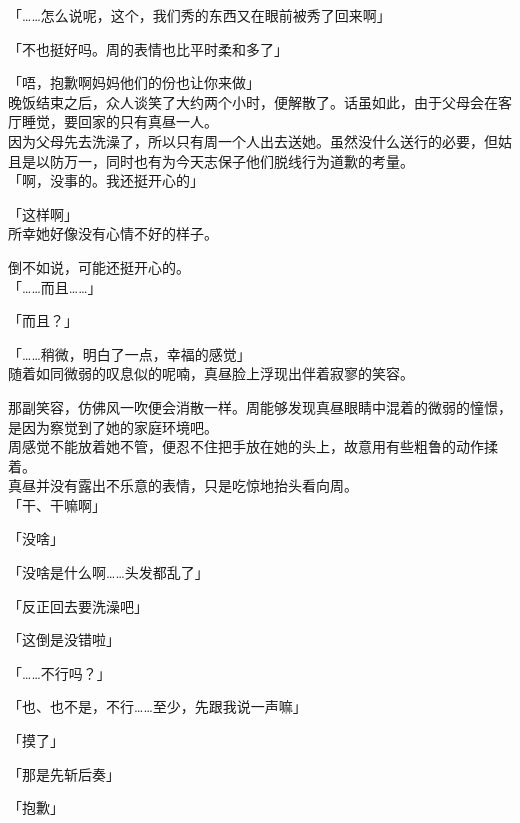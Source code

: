 「……怎么说呢，这个，我们秀的东西又在眼前被秀了回来啊」

「不也挺好吗。周的表情也比平时柔和多了」\\

\vspace{2\baselineskip}

「唔，抱歉啊妈妈他们的份也让你来做」\\

晚饭结束之后，众人谈笑了大约两个小时，便解散了。话虽如此，由于父母会在客厅睡觉，要回家的只有真昼一人。\\

因为父母先去洗澡了，所以只有周一个人出去送她。虽然没什么送行的必要，但姑且是以防万一，同时也有为今天志保子他们脱线行为道歉的考量。\\

「啊，没事的。我还挺开心的」

「这样啊」\\

所幸她好像没有心情不好的样子。

倒不如说，可能还挺开心的。\\

「……而且……」

「而且？」

「……稍微，明白了一点，幸福的感觉」\\

随着如同微弱的叹息似的呢喃，真昼脸上浮现出伴着寂寥的笑容。

那副笑容，仿佛风一吹便会消散一样。周能够发现真昼眼睛中混着的微弱的憧憬，是因为察觉到了她的家庭环境吧。\\

周感觉不能放着她不管，便忍不住把手放在她的头上，故意用有些粗鲁的动作揉着。\\

真昼并没有露出不乐意的表情，只是吃惊地抬头看向周。\\

「干、干嘛啊」

「没啥」

「没啥是什么啊……头发都乱了」

「反正回去要洗澡吧」

「这倒是没错啦」

「……不行吗？」

「也、也不是，不行……至少，先跟我说一声嘛」

「摸了」

「那是先斩后奏」

「抱歉」\\

